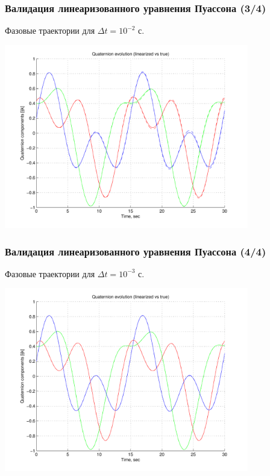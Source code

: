 \documentclass[utf8]{beamer}
\begin{document}
\begin{frame}
\frametitle{Валидация линеаризованного уравнения Пуассона (3/4)}
Фазовые траектории для $\Delta t = 10^{-2}$ с.
\begin{center}
\includegraphics[width=0.8\textwidth]{pic/extrapolation_001.pdf}    
\end{center}
\end{frame}
\begin{frame}
\frametitle{Валидация линеаризованного уравнения Пуассона (4/4)}
Фазовые траектории для $\Delta t = 10^{-3}$ с.
\begin{center}
\includegraphics[width=0.8\textwidth]{pic/extrapolation_0001.pdf}    
\end{center}
\end{frame}
\end{document}
